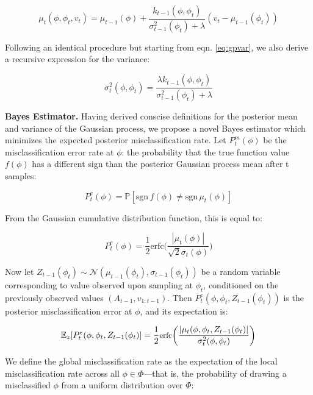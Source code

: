 \documentclass[12pt, conference]{IEEEtran}
\begin{document}
\begin{equation}
    \mu_t(\phi,\phi_t,v_t) = \mu_{t-1}(\phi) + \frac{k_{t-1}(\phi,\phi_t)}{\sigma_{t-1}^2(\phi_t)+\lambda}(v_t-\mu_{t-1}(\phi_t))
    \label{eq:recmu}
\end{equation}

Following an identical procedure but starting from eqn. \ref{eq:gpvar}, we also derive a recursive expression for the variance:

\begin{equation}
    \sigma_t^2(\phi,\phi_t) = \frac{\lambda k_{t-1}(\phi,\phi_t)}{\sigma_{t-1}^2(\phi_t)+\lambda}
    \label{eq:recsig}
\end{equation}
\smallskip

\noindent\textbf{Bayes Estimator.} Having derived conscise definitions for the posterior mean and variance of the Gaussian process, we propose a novel Bayes estimator which minimizes the expected posterior misclassification rate. Let $P^m_t(\phi)$ be the misclassification error rate at $\phi$: the probability that the true function value $f(\phi)$ has a different sign than the posterior Gaussian process mean after t samples: 

\begin{equation}
    P^e_t (\phi) = \mathbb{P}[\text{sgn}\,f(\phi)\neq \text{sgn}\,\mu_t(\phi)]
\end{equation}

From the Gaussian cumulative distribution function, this is equal to:

\begin{equation}
    P^e_t(\phi) = \frac{1}{2}\text{erfc}\bigg(\frac{|\mu_t(\phi)|}{\sqrt{2}\sigma_t(\phi)}\bigg)
\end{equation}
\smallskip

Now let $Z_{t-1}(\phi_t)\sim\mathcal{N}(\mu_{t-1}(\phi_t),\sigma_{t-1}(\phi_t))$ be a random variable corresponding to value observed upon sampling at $\phi_t$, conditioned on the previously observed values $(A_{t-1},v_{1:t-1})$. Then $P_t^e(\phi,\phi_t,Z_{t-1}(\phi_t))$ is the posterior misclassification error at $\phi$, and its expectation is:

\begin{equation}
    \small
    \mathbb{E}_{z}[P_t^e(\phi,\phi_t,Z_{t-1}(\phi_t)] = \frac{1}{2}\text{erfc}\bigg(\frac{|\mu_t(\phi,\phi_t,Z_{t-1}(\phi_t)|}{\sigma_t^2(\phi,\phi_t)}\bigg)
    \label{eq:exprec}
\end{equation}
\smallskip

We define the global misclassification rate as the expectation of the local misclassification rate across all $\phi\in\Phi$---that is, the probability of drawing a misclassified $\phi$ from a uniform distribution over $\Phi$:
\end{document}
